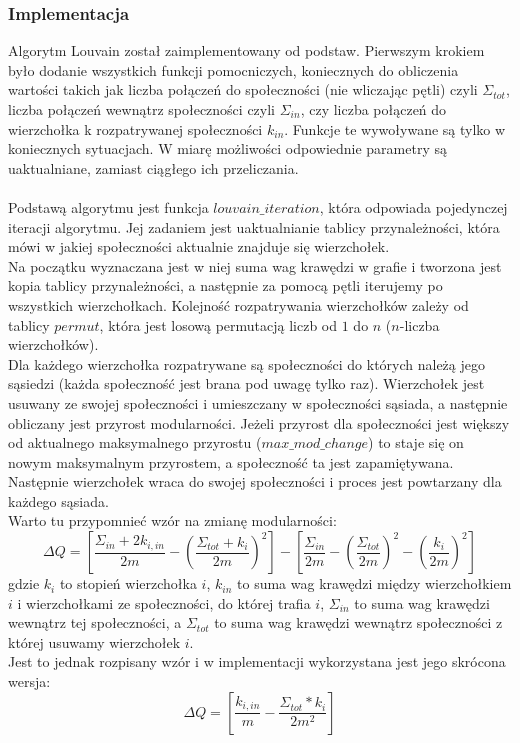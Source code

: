 \documentclass{article}
\begin{document}
\subsubsection{Implementacja}
Algorytm Louvain został zaimplementowany od podstaw. Pierwszym krokiem było dodanie wszystkich funkcji pomocniczych, koniecznych do obliczenia wartości takich jak liczba połączeń do społeczności (nie wliczając pętli) czyli $\Sigma_{tot}$, liczba połączeń wewnątrz społeczności czyli $\Sigma_{in}$, czy liczba połączeń do wierzchołka k rozpatrywanej społeczności $k_{in}$. Funkcje te wywoływane są tylko w koniecznych sytuacjach. W miarę możliwości odpowiednie parametry są uaktualniane, zamiast ciągłego ich przeliczania.\\ \\
Podstawą algorytmu jest funkcja $louvain\_ iteration$, która odpowiada pojedynczej iteracji algorytmu. Jej zadaniem jest uaktualnianie tablicy przynależności, która mówi w jakiej społeczności aktualnie znajduje się wierzchołek.\\ Na początku wyznaczana jest w niej suma wag krawędzi w grafie i tworzona jest kopia tablicy przynależności, a następnie za pomocą pętli iterujemy po wszystkich wierzchołkach. Kolejność rozpatrywania wierzchołków zależy od tablicy $permut$, która jest losową permutacją liczb od $1$ do $n$ ($n$-liczba wierzchołków). \\Dla każdego wierzchołka rozpatrywane są społeczności do których należą jego sąsiedzi (każda społeczność jest brana pod uwagę tylko raz). Wierzchołek jest usuwany ze swojej społeczności i umieszczany w społeczności sąsiada, a następnie obliczany jest przyrost modularności. Jeżeli przyrost dla społeczności jest większy od aktualnego maksymalnego przyrostu ($max\_ mod\_ change$) to staje się on nowym maksymalnym przyrostem, a społeczność ta jest zapamiętywana. Następnie wierzchołek wraca do swojej społeczności i proces jest powtarzany dla każdego sąsiada. \\
Warto tu przypomnieć wzór na zmianę modularności: $$\Delta Q = [\frac{\Sigma_{in} +2k_{i,in}}{2m} - (\frac{\Sigma_{tot} + k_i}{2m})^2] - [\frac{\Sigma_{in}}{2m} - (\frac{\Sigma_{tot}}{2m})^2 - (\frac{k_i}{2m})^2]$$ gdzie $k_i$ to stopień wierzchołka $i$, $k_{in}$ to suma wag krawędzi między wierzchołkiem $i$ i wierzchołkami ze społeczności, do której trafia $i$, $\Sigma_{in}$ to suma wag krawędzi wewnątrz tej społeczności, a $\Sigma_{tot}$ to suma wag krawędzi wewnątrz społeczności z której usuwamy wierzchołek $i$.\\Jest to jednak rozpisany wzór i w implementacji wykorzystana jest jego skrócona wersja: $$\Delta Q = [\frac{k_{i,in}}{m} - \frac{\Sigma_{tot}*k_i}{2m^2}]$$ \\
\end{document}
